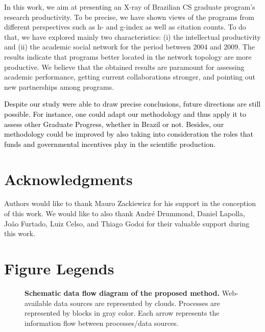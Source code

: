 \documentclass[10pt]{article}
\newcommand{\luciano}[1]{\textcolor{black}{#1}}
\begin{document}
In this work, we aim at presenting an X-ray of Brazilian CS graduate program's research productivity. To be precise,  we have
shown views of the programs from different perspectives such as h- and g-index as well as citation counts. To do that, we have
explored mainly two characteristics: (i) the intellectual productivity and (ii) the academic social network for the period
between 2004 and 2009. The results indicate that programs better located in the network topology are more productive.  We
believe that the obtained results are paramount for assessing academic performance, getting current collaborations stronger, and
pointing out new partnerships among programs. 

\luciano{Despite our study were able to draw precise conclusions, future directions are still possible. For instance, one could adapt our methodology and thus apply it to assess other Graduate Progress, whether in Brazil or not. Besides, our methodology could be improved by also taking into consideration the roles that funds and governmental incentives play in the scientific production.}



\section*{Acknowledgments}
Authors would like to thank Mauro Zackiewicz for his support in the conception of this work. We would like to also thank Andr\'{e} Drummond, Daniel Lapolla, Jo\~{a}o Furtado, Luiz Celso, and Thiago Godoi for their valuable support during this work.





\section*{Figure Legends}


\begin{figure*}[!ht]
    \caption{{\bf Schematic data flow diagram of the proposed method.}
	Web-available data sources are represented by clouds.
	Processes are represented by blocks in gray color.
    Each arrow represents the information flow between processes/data sources.} 
    \label{fig:diagram}
\end{figure*}
\end{document}
